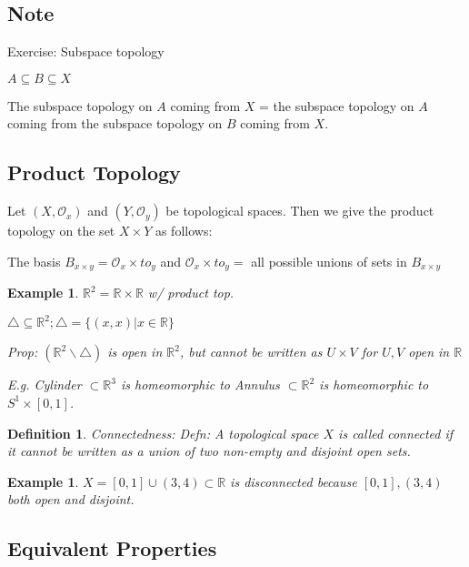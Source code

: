 \documentclass[twoside]{article}
\newcommand{\TO}{\mathcal O}
\newtheorem{definition}[theorem]{Definition}
\newtheorem{example}[theorem]{Example}
\newcommand\R{\mathbb{R}}
\begin{document}
\subsection{Note}

Exercise: Subspace topology

$A \subseteq B \subseteq X$

The subspace topology on $A$ coming from $X$ = the subspace topology on $A$ coming from the subspace topology on $B$ coming from $X$. 

\subsection{Product Topology}

Let $(X, \TO_x)$ and $(Y, \TO_y)$ be topological spaces. Then we give the product topology on the set $X \times Y$ as follows:

The basis $B_{x\times y} = \TO_x \times to_y$ and $\TO_x \times to_y =$ all possible unions of sets in $B_{x \times y}$

\begin{example}
    $\R^2 = \R \times \R$ w/ product top. 

    $\triangle \subseteq \R^2; \triangle = \{(x,x) \vert x \in \R\}$

    Prop: $(\R^2 \backslash \triangle)$ is open in $\R^2$, but cannot be written as $U \times V$ for $U,V$ open in $\R$

    E.g. Cylinder $\subset \R^3$ is homeomorphic to Annulus $\subset \R^2$ is homeomorphic to $S^1 \times [0,1]$.     
\end{example}

\begin{definition}
    Connectedness: Defn: A topological space $X$ is called connected if it cannot be written as a union of two non-empty and disjoint open sets. 
\end{definition}
\begin{example}
    $X = [0,1] \cup (3,4) \subset \R$ is disconnected because $[0,1], (3,4)$ both open and disjoint. 
\end{example}

\subsection{Equivalent Properties}
\end{document}
